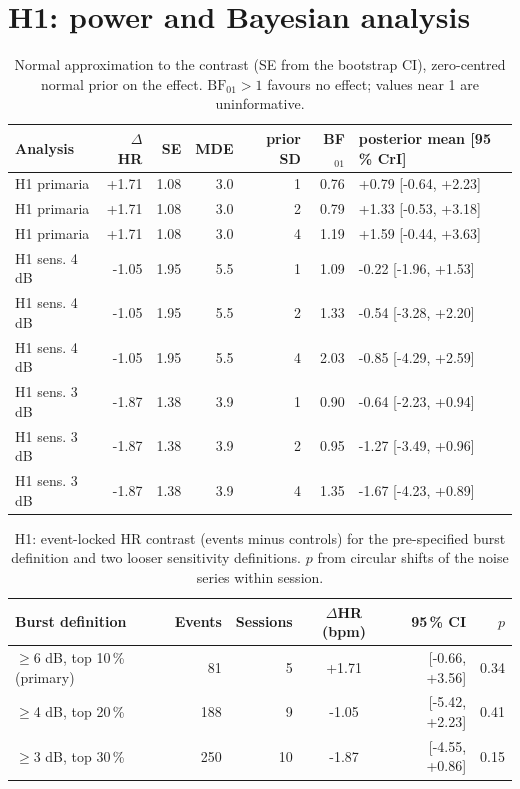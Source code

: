 \documentclass[runningheads]{llncs}
\begin{document}
\section{H1: power and Bayesian analysis}
\begin{table}[h]
\caption{Normal approximation to the contrast (SE from the bootstrap CI), zero-centred normal prior on the effect. $\mathrm{BF}_{01}>1$ favours no effect; values near 1 are uninformative.}
\footnotesize\centering
\begin{tabular}{@{}lrrrrrl@{}}
\toprule
Analysis & $\Delta$HR & SE & MDE & prior SD & BF$_{01}$ & posterior mean [95\,\% CrI]\\
\midrule
H1 primaria & +1.71 & 1.08 & 3.0 & 1 & 0.76 & +0.79 [-0.64, +2.23]\\
H1 primaria & +1.71 & 1.08 & 3.0 & 2 & 0.79 & +1.33 [-0.53, +3.18]\\
H1 primaria & +1.71 & 1.08 & 3.0 & 4 & 1.19 & +1.59 [-0.44, +3.63]\\
H1 sens. 4 dB & -1.05 & 1.95 & 5.5 & 1 & 1.09 & -0.22 [-1.96, +1.53]\\
H1 sens. 4 dB & -1.05 & 1.95 & 5.5 & 2 & 1.33 & -0.54 [-3.28, +2.20]\\
H1 sens. 4 dB & -1.05 & 1.95 & 5.5 & 4 & 2.03 & -0.85 [-4.29, +2.59]\\
H1 sens. 3 dB & -1.87 & 1.38 & 3.9 & 1 & 0.90 & -0.64 [-2.23, +0.94]\\
H1 sens. 3 dB & -1.87 & 1.38 & 3.9 & 2 & 0.95 & -1.27 [-3.49, +0.96]\\
H1 sens. 3 dB & -1.87 & 1.38 & 3.9 & 4 & 1.35 & -1.67 [-4.23, +0.89]\\
\bottomrule
\end{tabular}
\end{table}

\begin{table}[h]
\caption{H1: event-locked HR contrast (events minus controls) for the pre-specified burst definition and two looser sensitivity definitions. $p$ from circular shifts of the noise series within session.}
\footnotesize\centering
\begin{tabular}{@{}lrrcrr@{}}
\toprule
Burst definition & Events & Sessions & $\Delta$HR (bpm) & 95\,\% CI & $p$\\
\midrule
$\geq$6 dB, top 10\,\% (primary) & 81 & 5 & +1.71 & [-0.66, +3.56] & 0.34\\
$\geq$4 dB, top 20\,\% & 188 & 9 & -1.05 & [-5.42, +2.23] & 0.41\\
$\geq$3 dB, top 30\,\% & 250 & 10 & -1.87 & [-4.55, +0.86] & 0.15\\
\bottomrule
\end{tabular}
\end{table}
\end{document}
